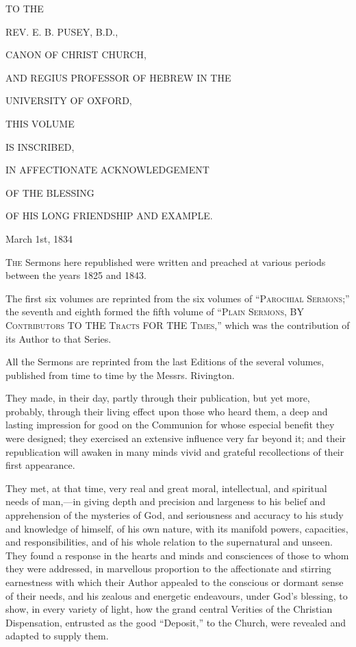 



TO THE


REV. E. B. PUSEY, B.D.,


CANON OF CHRIST CHURCH,


AND REGIUS PROFESSOR OF
HEBREW IN THE


UNIVERSITY OF OXFORD,


THIS VOLUME


IS INSCRIBED,


IN AFFECTIONATE
ACKNOWLEDGEMENT


OF THE BLESSING


OF HIS LONG FRIENDSHIP
AND EXAMPLE.


March 1st,
1834








T\textsc{he} Sermons here republished were
written and preached at various periods between the years
1825 and 1843.


The first six volumes are reprinted from the six
volumes of ``P\textsc{arochial} S\textsc{ermons};'' the seventh and
eighth formed the fifth volume of ``P\textsc{lain} S\textsc{ermons},
BY C\textsc{ontributors} TO THE
T\textsc{racts} FOR THE T\textsc{imes},'' which was
the contribution of its Author to that Series.


All the Sermons are reprinted from the last Editions
of the several volumes, published from time to time by
the Messrs. Rivington.


They made, in their day, partly through their
publication, but yet more, probably, through their living
effect upon those who heard them, a deep and lasting
impression for good on the Communion for whose especial
benefit they were designed; they exercised an extensive
influence very far beyond it; and their republication
will awaken in many minds vivid and grateful
recollections of their first appearance.


They met, at that time, very real and great moral,
intellectual, and spiritual needs of man,—in giving
depth and precision and largeness to his belief and
apprehension of the mysteries of God, and seriousness and
accuracy to his study and knowledge of himself, of his
own nature, with its manifold powers, capacities, and
responsibilities, and of his whole relation to the
supernatural and unseen. They found a response in the
hearts and minds and consciences of those to whom they
were addressed, in marvellous proportion to the
affectionate and stirring earnestness with which their
Author appealed to the conscious or dormant sense of
their needs, and his zealous and energetic endeavours,
under God's blessing, to show, in every variety of light,
how the grand central Verities of the Christian
Dispensation, entrusted as the good ``Deposit,''
to the Church, were revealed and adapted to supply them.

